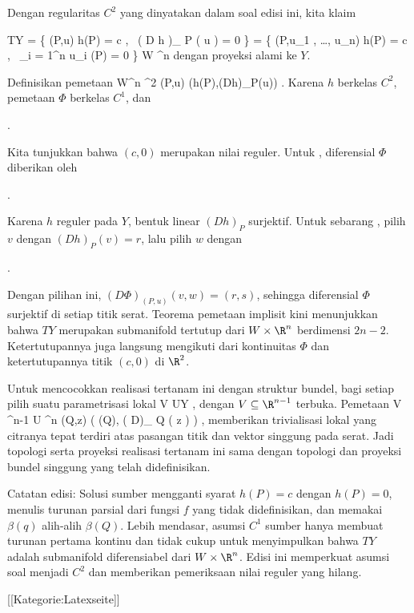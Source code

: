 Dengan regularitas $C^2$ yang dinyatakan dalam soal edisi ini, kita klaim

\mavergleichskettealignhandlinks
{\vergleichskettealignhandlinks
{ TY
}
{ =} { \left\{  (P,u)   \mid   h(P) = c , \,  \left(  D h   \right)_{ P } \left(  u  \right) = 0       \right\}
}
{ =} { \left\{  (P,u_1 , \ldots , u_n)   \mid   h(P) = c , \,  \sum_{i = 1}^n u_i {  } (P) = 0       \right\}
}
{ \subseteq} { W \times \R^n
}
{ } {
}
}
{}
{}{}
dengan proyeksi alami ke $Y$.

Definisikan pemetaan
\maabbeledisp {\Phi} {W\times\R^n} {\R^2
} {(P,u)} {\left(h(P),\left(Dh\right)_P(u)\right)
} {.}
Karena $h$ berkelas $C^2$, pemetaan $\Phi$ berkelas $C^1$, dan

 { . }

Kita tunjukkan bahwa $(c,0)$ merupakan nilai reguler. Untuk
, diferensial $\Phi$ diberikan oleh

 { . }

Karena $h$ reguler pada $Y$, bentuk linear $(Dh)_P$ surjektif. Untuk sebarang
, pilih $v$ dengan $(Dh)_P(v)=r$, lalu pilih $w$ dengan

 { . }

Dengan pilihan ini, $(D\Phi)_{(P,u)}(v,w)=(r,s)$, sehingga diferensial $\Phi$ surjektif di setiap titik serat. Teorema pemetaan implisit kini menunjukkan bahwa $TY$ merupakan submanifold tertutup dari $W\times\R^n$ berdimensi $2n-2$. Ketertutupannya juga langsung mengikuti dari kontinuitas $\Phi$ dan ketertutupannya titik $(c,0)$ di $\R^2$.

Untuk mencocokkan realisasi tertanam ini dengan struktur bundel, bagi setiap
pilih suatu parametrisasi lokal
\maabbdisp {\beta} {V} {U\subseteq Y
} {,}
dengan $V\subseteq\R^{n-1}$ terbuka. Pemetaan
\maabbeledisp {} {V \times \R^{n-1} } { U \times \R^n
} {(Q,z)} { ( \beta(Q), \left(  D\beta  \right)_{ Q } \left(  z  \right) )
} {,}
memberikan trivialisasi lokal yang citranya tepat terdiri atas pasangan titik dan vektor singgung pada serat. Jadi topologi serta proyeksi realisasi tertanam ini sama dengan topologi dan proyeksi bundel singgung yang telah didefinisikan.

Catatan edisi: Solusi sumber mengganti syarat $h(P)=c$ dengan $h(P)=0$, menulis turunan parsial dari fungsi $f$ yang tidak didefinisikan, dan memakai $\beta(q)$ alih-alih $\beta(Q)$. Lebih mendasar, asumsi $C^1$ sumber hanya membuat turunan pertama kontinu dan tidak cukup untuk menyimpulkan bahwa $TY$ adalah submanifold diferensiabel dari $W\times\R^n$. Edisi ini memperkuat asumsi soal menjadi $C^2$ dan memberikan pemeriksaan nilai reguler yang hilang.

 [[Kategorie:Latexseite]]
